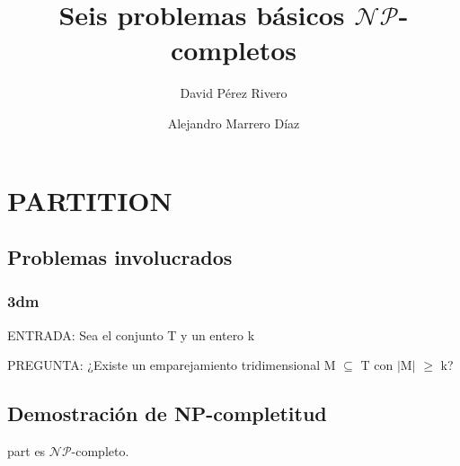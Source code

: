 \documentclass[11pt, a4paper]{memoir}
\title{\Huge Seis problemas básicos $\mathcal{NP}$-completos}
\author{David Pérez Rivero}
\author{Alejandro Marrero Díaz}
\affil{Grado en Ingeniería Informática. Universidad de La Laguna}
\begin{document}
\maketitle

\chapter{PARTITION}

\section{Problemas involucrados}

\subsection*{\gls{3dm}}

\noindent ENTRADA: Sea el conjunto T y un entero k 

\noindent PREGUNTA: ¿Existe un emparejamiento tridimensional M $\subseteq$ T con $\mid$M$\mid$ $\geq$ k? 


\section{Demostración de NP-completitud}

\begin{thm}
	\gls{part} es $\mathcal{NP}$-completo.
\end{thm}
\end{document}
